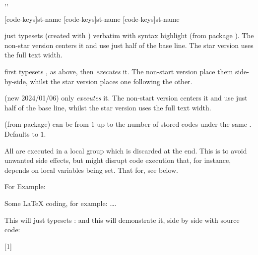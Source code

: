 \documentclass{article}
\begin{document}
\begin{codedescribe}[code,update=2024/01/06,update=2025/04/29]{\tscode*,\tsdemo*,\tsresult*}
	\begin{codesyntax}%
		\tsmacro{\tscode*}[code-keys]{st-name}
		\tsmacro{\tsdemo*}[code-keys]{st-name}
		\tsmacro{\tsresult*}[code-keys]{st-name}
	\end{codesyntax}
\tsmacro{\tscode*}{} just typesets  (created with ) verbatim with syntax highlight (from  package \cite{listings}). The non-star version centers it and use just half of the base line. The star version uses the full text width.

\tsmacro{\tsdemo*}{} first typesets , as above, then \emph{executes} it. The non-start version place them side-by-side, whilst the star version places one following the other.

(new 2024/01/06) \tsmacro{\tsresult*}{} only \emph{executes} it. The non-start version centers it and use just half of the base line, whilst the star version uses the full text width.
\end{codedescribe}

\begin{tsremark}
  (from  package)  can be from $1$ up to the number of stored codes under the same . Defaults to $1$.
\end{tsremark}

\begin{tsremark}
  All are executed in a local group which is discarded at the end. This is to avoid unwanted side effects, but might disrupt code execution that, for instance, depends on local variables being set. That for, see \tsobj{\tsexec} below.
\end{tsremark}

For Example:
\begin{codestore}[st=democodestore]
\begin{codestore}[stmeta]
		Some \LaTeX{} coding, for example: \ldots.
\end{codestore}  
This will just typesets :
and this will demonstrate it, side by side with source code:
\end{codestore}
[1]
\end{document}
